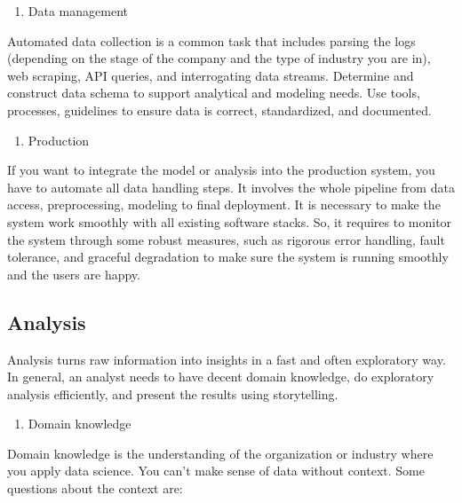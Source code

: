 \documentclass[12pt,]{krantz}
\providecommand{\tightlist}{%
  \setlength{\itemsep}{0pt}\setlength{\parskip}{0pt}}
\begin{document}
\begin{enumerate}
\def\labelenumi{(\arabic{enumi})}
\setcounter{enumi}{1}
\tightlist
\item
  Data management
\end{enumerate}

Automated data collection is a common task that includes parsing the logs (depending on the stage of the company and the type of industry you are in), web scraping, API queries, and interrogating data streams. Determine and construct data schema to support analytical and modeling needs. Use tools, processes, guidelines to ensure data is correct, standardized, and documented.

\begin{enumerate}
\def\labelenumi{(\arabic{enumi})}
\setcounter{enumi}{2}
\tightlist
\item
  Production
\end{enumerate}

If you want to integrate the model or analysis into the production system, you have to automate all data handling steps. It involves the whole pipeline from data access, preprocessing, modeling to final deployment. It is necessary to make the system work smoothly with all existing software stacks. So, it requires to monitor the system through some robust measures, such as rigorous error handling, fault tolerance, and graceful degradation to make sure the system is running smoothly and the users are happy.

\hypertarget{analysis}{%
\subsection{Analysis}\label{analysis}}

Analysis turns raw information into insights in a fast and often exploratory way. In general, an analyst needs to have decent domain knowledge, do exploratory analysis efficiently, and present the results using storytelling.

\begin{enumerate}
\def\labelenumi{(\arabic{enumi})}
\tightlist
\item
  Domain knowledge
\end{enumerate}

Domain knowledge is the understanding of the organization or industry where you apply data science. You can't make sense of data without context. Some questions about the context are:
\end{document}
